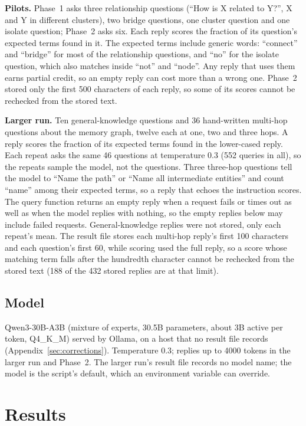 \documentclass[11pt,a4paper]{article}
\begin{document}
\textbf{Pilots.} Phase~1 asks three relationship questions (``How is X related to Y?'', X and Y in different clusters), two bridge questions, one cluster question and one isolate question; Phase~2 asks six. Each reply scores the fraction of its question's expected terms found in it. The expected terms include generic words: ``connect'' and ``bridge'' for most of the relationship questions, and ``no'' for the isolate question, which also matches inside ``not'' and ``node''. Any reply that uses them earns partial credit, so an empty reply can cost more than a wrong one. Phase~2 stored only the first 500 characters of each reply, so some of its scores cannot be rechecked from the stored text.

\textbf{Larger run.} Ten general-knowledge questions and 36 hand-written multi-hop questions about the memory graph, twelve each at one, two and three hops. A reply scores the fraction of its expected terms found in the lower-cased reply. Each repeat asks the same 46 questions at temperature 0.3 (552 queries in all), so the repeats sample the model, not the questions. Three three-hop questions tell the model to ``Name the path'' or ``Name all intermediate entities'' and count ``name'' among their expected terms, so a reply that echoes the instruction scores. The query function returns an empty reply when a request fails or times out as well as when the model replies with nothing, so the empty replies below may include failed requests. General-knowledge replies were not stored, only each repeat's mean. The result file stores each multi-hop reply's first 100 characters and each question's first 60, while scoring used the full reply, so a score whose matching term falls after the hundredth character cannot be rechecked from the stored text (188 of the 432 stored replies are at that limit).

\subsection{Model}

Qwen3-30B-A3B (mixture of experts, 30.5B parameters, about 3B active per token, Q4\_K\_M) served by Ollama, on a host that no result file records (Appendix~\ref{sec:corrections}). Temperature 0.3; replies up to 4000 tokens in the larger run and Phase~2. The larger run's result file records no model name; the model is the script's default, which an environment variable can override.

\section{Results}
\end{document}
